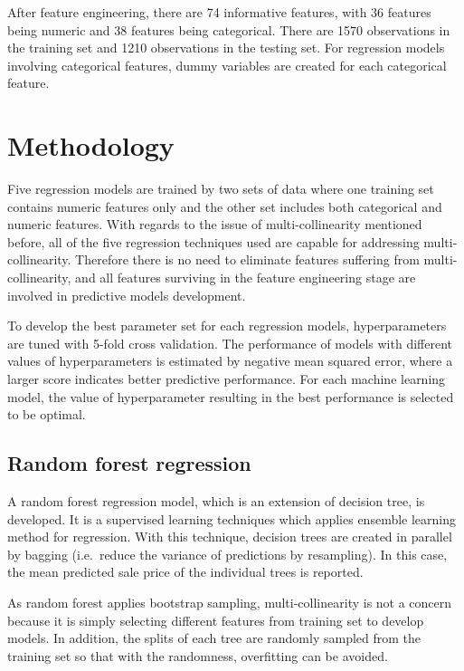 \documentclass[letterpaper,12pt,twoside,]{pinp}
\begin{document}
After feature engineering, there are 74 informative features, with 36
features being numeric and 38 features being categorical. There are 1570
observations in the training set and 1210 observations in the testing
set. For regression models involving categorical features, dummy
variables are created for each categorical feature.

\hypertarget{methodology}{%
\section{Methodology}\label{methodology}}

Five regression models are trained by two sets of data where one
training set contains numeric features only and the other set includes
both categorical and numeric features. With regards to the issue of
multi-collinearity mentioned before, all of the five regression
techniques used are capable for addressing multi-collinearity. Therefore
there is no need to eliminate features suffering from
multi-collinearity, and all features surviving in the feature
engineering stage are involved in predictive models development.

To develop the best parameter set for each regression models,
hyperparameters are tuned with 5-fold cross validation. The performance
of models with different values of hyperparameters is estimated by
negative mean squared error, where a larger score indicates better
predictive performance. For each machine learning model, the value of
hyperparameter resulting in the best performance is selected to be
optimal.

\hypertarget{random-forest-regression}{%
\subsection{Random forest regression}\label{random-forest-regression}}

A random forest regression model, which is an extension of decision
tree, is developed. It is a supervised learning techniques which applies
ensemble learning method for regression. With this technique, decision
trees are created in parallel by bagging (i.e.~reduce the variance of
predictions by resampling). In this case, the mean predicted sale price
of the individual trees is reported.

As random forest applies bootstrap sampling, multi-collinearity is not a
concern because it is simply selecting different features from training
set to develop models. In addition, the splits of each tree are randomly
sampled from the training set so that with the randomness, overfitting
can be avoided.
\end{document}
